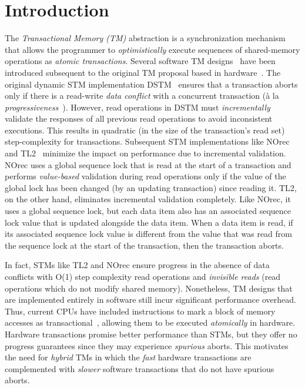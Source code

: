 \section{Introduction}
\label{sec:intro}
%
%
The \emph{Transactional Memory (TM)} abstraction is a synchronization mechanism 
that allows the programmer to \emph{optimistically} execute sequences of shared-memory
operations as \emph{atomic transactions}.
Several software TM designs~\cite{norec, ST95,HLM+03, astm, fraser} have been introduced subsequent to the original TM proposal based in
hardware~\cite{HM93}. 
The original dynamic STM implementation DSTM~\cite{HLM+03} ensures that a transaction aborts only if there is a read-write \emph{data conflict} with a concurrent
transaction (\`a la \emph{progressiveness}~\cite{tm-book}). However, read operations in DSTM must \emph{incrementally} validate
the responses of all previous read operations to avoid inconsistent executions. 
This results in quadratic  (in the size of the transaction's read
set) step-complexity for transactions. Subsequent STM 
implementations like NOrec~\cite{norec} and TL2~\cite{DSS06}
minimize the impact on performance due to incremental validation.
NOrec uses a global sequence lock that is read at the start of a transaction and performs \emph{value-based}
validation during read operations only if the value of the global lock has been changed (by an updating transaction) 
since reading it.
TL2, on the other hand, eliminates incremental validation completely.
Like NOrec, it uses a global sequence lock, but each data item also 
has an associated sequence lock value that is updated alongside the data item.
When a data item is read, if its associated sequence lock value is different 
from the value that was read from the sequence lock at the start of the transaction, then the transaction aborts.

In fact, STMs like TL2 and NOrec ensure progress in the absence of data conflicts with 
O(1) step complexity read operations and \emph{invisible reads} (read operations which 
do not modify shared memory).
Nonetheless, TM designs that are implemented entirely in software still incur significant performance overhead.
Thus, current CPUs have included instructions to mark a block of memory accesses as transactional~\cite{Rei12, asf, bluegene}, allowing them to be executed \emph{atomically} in hardware.
Hardware transactions promise better performance than STMs, but they offer no progress guarantees 
since they may experience \emph{spurious} aborts. This motivates the need for
\emph{hybrid} TMs in which the \emph{fast} hardware transactions are 
complemented with \emph{slower} software transactions that do not have spurious aborts.

